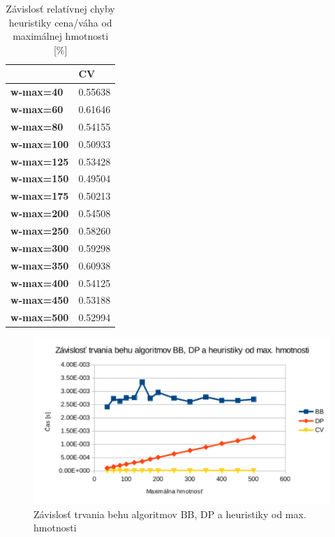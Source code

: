 \documentclass[slovak]{article}
\begin{document}
\begin{table}[htb!]\centering
	\begin{tabularx}{\textwidth}{ | X | X | }
	  \hline                       
							& \textbf{CV} 	\\ \hline
		\textbf{w-max=40}	&	0.55638
			\\ \hline
		\textbf{w-max=60}	&	0.61646
			\\ \hline
		\textbf{w-max=80}	&	0.54155
			\\ \hline
		\textbf{w-max=100}	&	0.50933
			\\ \hline
		\textbf{w-max=125}	&	0.53428
			\\ \hline
		\textbf{w-max=150}	&	0.49504
			\\ \hline
		\textbf{w-max=175}	&	0.50213
			\\ \hline
		\textbf{w-max=200}	&	0.54508
			\\ \hline
		\textbf{w-max=250}	&	0.58260
			\\ \hline
		\textbf{w-max=300}	&	0.59298
			\\ \hline
		\textbf{w-max=350}	&	0.60938
			\\ \hline
		\textbf{w-max=400}	&	0.54125
			\\ \hline
		\textbf{w-max=450}	&	0.53188
			\\ \hline								
		\textbf{w-max=500}	&	0.52994
			\\ \hline								
	\end{tabularx}
\caption{Závislosť relatívnej chyby heuristiky cena/váha od maximálnej hmotnosti [\%]}
\label{tab2}
\end{table}

\begin{figure}[htb!]\centering
	\includegraphics[scale=0.8]{./3_1.pdf}
	\caption{Závislosť trvania behu algoritmov BB, DP a heuristiky od max. hmotnosti}
	\label{gr:graf1}
\end{figure}
\end{document}
